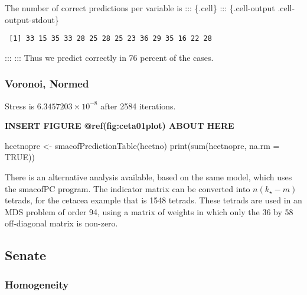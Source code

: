 \documentclass[
  12pt,
  letterpaper,
  DIV=11,
  numbers=noendperiod]{scrartcl}
\newenvironment{Shaded}{\begin{snugshade}}{\end{snugshade}}
\newcommand{\AttributeTok}[1]{\textcolor[rgb]{0.40,0.45,0.13}{#1}}
\newcommand{\ConstantTok}[1]{\textcolor[rgb]{0.56,0.35,0.01}{#1}}
\newcommand{\FunctionTok}[1]{\textcolor[rgb]{0.28,0.35,0.67}{#1}}
\newcommand{\NormalTok}[1]{\textcolor[rgb]{0.00,0.23,0.31}{#1}}
\newcommand{\OtherTok}[1]{\textcolor[rgb]{0.00,0.23,0.31}{#1}}
\begin{document}
The number of correct predictions per variable is ::: \{.cell\} :::
\{.cell-output .cell-output-stdout\}

\begin{verbatim}
 [1] 33 15 35 33 28 25 28 25 23 36 29 35 16 22 28
\end{verbatim}

::: ::: Thus we predict correctly in 76 percent of the cases.

\subsubsection{Voronoi, Normed}\label{voronoi-normed}

Stress is \ensuremath{6.3457203\times 10^{-8}} after 2584 iterations.

\begin{greybox}

\begin{center}
\textbf{INSERT FIGURE @ref(fig:ceta01plot) ABOUT HERE}

\end{center}

\end{greybox}

\begin{Shaded}
\begin{Highlighting}[]
\NormalTok{hcetnopre }\OtherTok{\textless{}{-}} \FunctionTok{smacofPredictionTable}\NormalTok{(hcetno)}
\FunctionTok{print}\NormalTok{(}\FunctionTok{sum}\NormalTok{(hcetnopre, }\AttributeTok{na.rm =} \ConstantTok{TRUE}\NormalTok{))}
\end{Highlighting}
\end{Shaded}

There is an alternative analysis available, based on the same model,
which uses the smacofPC program. The indicator matrix can be converted
into \(n(k_\star-m)\) tetrads, for the cetacea example that is 1548
tetrads. These tetrads are used in an MDS problem of order 94, using a
matrix of weights in which only the 36 by 58 off-diagonal matrix is
non-zero.

\subsection{Senate}\label{senate}

\subsubsection{Homogeneity}\label{homogeneity-2}
\end{document}
